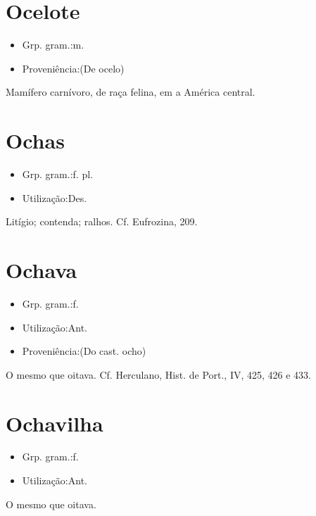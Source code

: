 \section{Ocelote}
\begin{itemize}
\item {Grp. gram.:m.}
\end{itemize}
\begin{itemize}
\item {Proveniência:(De \textunderscore ocelo\textunderscore )}
\end{itemize}
Mamífero carnívoro, de raça felina, em a América central.
\section{Ochas}
\begin{itemize}
\item {Grp. gram.:f. pl.}
\end{itemize}
\begin{itemize}
\item {Utilização:Des.}
\end{itemize}
Litígio; contenda; ralhos. Cf. \textunderscore Eufrozina\textunderscore , 209.
\section{Ochava}
\begin{itemize}
\item {Grp. gram.:f.}
\end{itemize}
\begin{itemize}
\item {Utilização:Ant.}
\end{itemize}
\begin{itemize}
\item {Proveniência:(Do cast. \textunderscore ocho\textunderscore )}
\end{itemize}
O mesmo que \textunderscore oitava\textunderscore . Cf. Herculano, \textunderscore Hist. de Port.\textunderscore , IV, 425, 426 e 433.
\section{Ochavilha}
\begin{itemize}
\item {Grp. gram.:f.}
\end{itemize}
\begin{itemize}
\item {Utilização:Ant.}
\end{itemize}
O mesmo que \textunderscore oitava\textunderscore .
